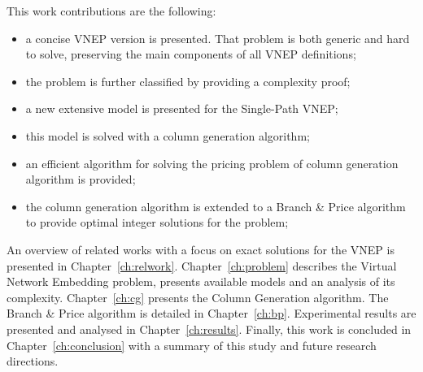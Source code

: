 
This work contributions are the following:

\begin{itemize}
  \item a concise VNEP version is presented. That problem is both generic and hard to solve, preserving the main components of all VNEP definitions;
  \item the problem is further classified by providing a complexity proof;
  \item a new extensive model is presented for the Single-Path VNEP;
  \item this model is solved with a column generation algorithm;
  \item an efficient algorithm for solving the pricing problem of column generation algorithm is provided;
  \item the column generation algorithm is extended to a Branch \& Price algorithm to provide optimal integer solutions for the problem;
\end{itemize}

An overview of related works with a focus on exact solutions for the VNEP is presented in Chapter~\ref{ch:relwork}.
Chapter~\ref{ch:problem} describes the Virtual Network Embedding problem, presents available models and an analysis of its complexity.
Chapter~\ref{ch:cg} presents the Column Generation algorithm.
The Branch \& Price algorithm is detailed in Chapter~\ref{ch:bp}.
Experimental results are presented and analysed in Chapter~\ref{ch:results}.
Finally, this work is concluded in Chapter~\ref{ch:conclusion} with a summary of this study and future research directions.

